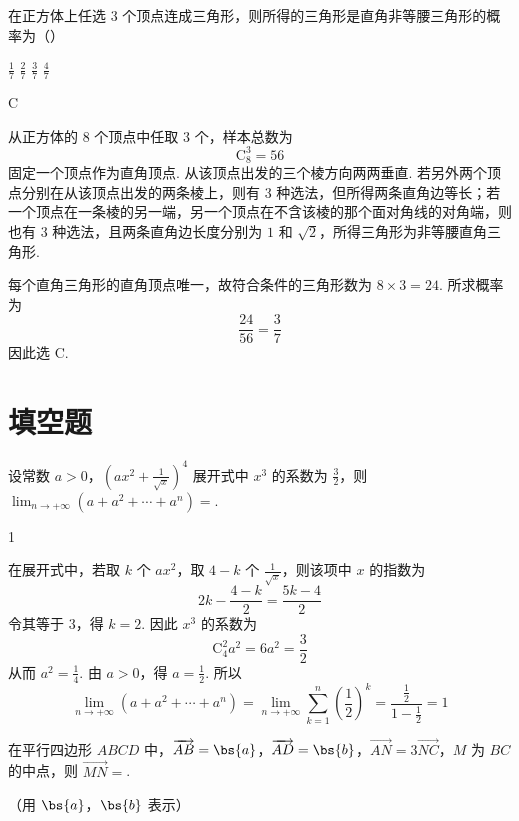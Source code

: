 \begin{problem}
在正方体上任选 \(3\) 个顶点连成三角形，则所得的三角形是直角非等腰三角形的概率为（\quad）

\choices
    {\(\frac{1}{7}\)}
    {\(\frac{2}{7}\)}
    {\(\frac{3}{7}\)}
    {\(\frac{4}{7}\)}
\end{problem}

\begin{answer}
C
\end{answer}

\begin{solution}
从正方体的 \(8\) 个顶点中任取 \(3\) 个，样本总数为
\[
\mathrm C_{8}^{3}=56
\]
固定一个顶点作为直角顶点. 从该顶点出发的三个棱方向两两垂直. 若另外两个顶点分别在从该顶点出发的两条棱上，则有 \(3\) 种选法，但所得两条直角边等长；若一个顶点在一条棱的另一端，另一个顶点在不含该棱的那个面对角线的对角端，则也有 \(3\) 种选法，且两条直角边长度分别为 \(1\) 和 \(\sqrt{2}\)，所得三角形为非等腰直角三角形.

每个直角三角形的直角顶点唯一，故符合条件的三角形数为 \(8\times3=24\). 所求概率为
\[
\frac{24}{56}=\frac{3}{7}
\]
因此选 C.
\end{solution}

\section{填空题}
\begin{problem}
设常数 \(a > 0\)，\(\left(a x^2 + \frac{1}{\sqrt{x}}\right)^4\) 展开式中 \(x^3\) 的系数为 \(\frac{3}{2}\)，则 \(\displaystyle\lim_{n \to +\infty} (a + a^2 + \cdots + a^n) = \)\fillinblank{}.
\end{problem}

\begin{answer}
1
\end{answer}

\begin{solution}
在展开式中，若取 \(k\) 个 \(ax^2\)，取 \(4-k\) 个 \(\frac{1}{\sqrt{x}}\)，则该项中 \(x\) 的指数为
\[
2k-\frac{4-k}{2}=\frac{5k-4}{2}
\]
令其等于 \(3\)，得 \(k=2\). 因此 \(x^3\) 的系数为
\[
\mathrm C_{4}^{2}a^2=6a^2=\frac{3}{2}
\]
从而 \(a^2=\frac{1}{4}\). 由 \(a>0\)，得 \(a=\frac{1}{2}\). 所以
\[
\lim_{n\to+\infty}(a+a^2+\cdots+a^n)
=\lim_{n\to+\infty}\sum_{k=1}^{n}\left(\frac12\right)^k
=\frac{\frac{1}{2}}{1-\frac{1}{2}}=1
\]
\end{solution}

\begin{problem}
在平行四边形 \(ABCD\) 中，\(\overrightarrow{AB} = \bs{a}\)，\(\overrightarrow{AD} = \bs{b}\)，\(\overrightarrow{AN} = 3\overrightarrow{NC}\)，\(M\) 为 \(BC\) 的中点，则 \(\overrightarrow{MN} =\)\fillinblank{}.

（用 \(\bs{a}\)，\(\bs{b}\) 表示）
\end{problem}

